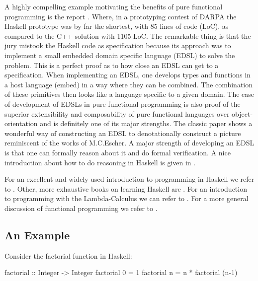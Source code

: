 A highly compelling example motivating the benefits of pure functional programming is the report \cite{hudak_haskell_1994}. Where, in a prototyping contest of DARPA the Haskell prototype was by far the shortest, with 85 lines of code (LoC), as compared to the C++ solution with 1105 LoC. The remarkable thing is that the jury mistook the Haskell code as specification because its approach was to implement a small embedded domain specific language (EDSL) to solve the problem. This is a perfect proof as to how close an EDSL can get to a specification. When implementing an EDSL, one develops types and functions in a host language (embed) in a way where they can be combined. The combination of these primitives then looks like a language specific to a given domain. The ease of development of EDSLs in pure functional programming is also proof of the superior extensibility and composability of pure functional languages over object-orientation and is definitely one of its major strengths. The classic paper \cite{henderson_functional_1982} shows a wonderful way of constructing an EDSL to denotationally construct a picture reminiscent of the works of M.C.Escher. A major strength of developing an EDSL is that one can formally reason about it and do formal verification. A nice introduction about how to do reasoning in Haskell is given in \cite{hutton_tutorial_1999}.

For an excellent and widely used introduction to programming in Haskell we refer to \cite{hutton_programming_2016}. Other, more exhaustive books on learning Haskell are \cite{allen_haskell_2016, lipovaca_learn_2011}. For an introduction to programming with the Lambda-Calculus we can refer to \cite{michaelson_introduction_2011}. For a more general discussion of functional programming we refer to \cite{hudak_history_2007,hughes_why_1989,maclennan_functional_1990}.

\subsection{An Example}
Consider the factorial function in Haskell:
\begin{HaskellCode}
factorial :: Integer -> Integer
factorial 0 = 1
factorial n = n * factorial (n-1)
\end{HaskellCode}

